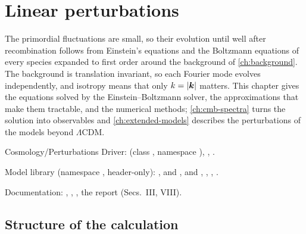 \chapter{Linear perturbations}\label{ch:linear-perturbations}

The primordial fluctuations are small, so their evolution until well after recombination follows from Einstein's
equations and the Boltzmann equations of every species expanded to first order around the background of
\cref{ch:background}. The background is translation invariant, so each Fourier mode evolves independently, and
isotropy means that only $k=|\bm{k}|$ matters. This chapter gives the equations solved by the Einstein--Boltzmann solver,
the approximations that make them tractable, and the numerical methods; \cref{ch:cmb-spectra} turns the solution
into observables and \cref{ch:extended-models} describes the perturbations of the models beyond $\Lambda$CDM.

\begin{modulebox}{Cosmology/Perturbations}
Driver:  (class , namespace ), ,
.\par
Model library (namespace , header-only): ,
 and ,  and
, , , .\par
Documentation: , ,
, the report  (Secs.~III, VIII).
\end{modulebox}

\section{Structure of the calculation}\label{sec:pert-structure}

